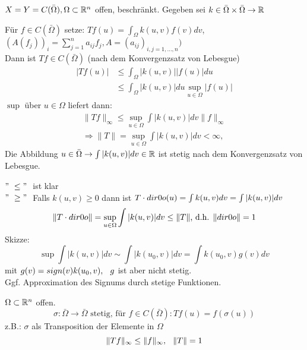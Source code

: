 \begin{beispiel}[Integraloperator] 
	$X = Y = C(\bar \Omega), \Omega \subset \mathbb{R}^{n}$ offen, beschränkt.
	Gegeben sei $k \in \bar \Omega \times \bar \Omega \rightarrow \mathbb{R} $
	
	Für $f \in C(\bar \Omega)$ setze: $Tf(u) = \int_{\Omega} k(u, v) f(v) dv$, \hspace{0.25cm}
	$\left( A( f_{j} ) \right)_{i} = \sum_{j = 1}^{n} a_{ij}f_{j}, A = (a_{ij})_{i,j = 1, \dotsc, n} )$ \\
	
	Dann ist $Tf \in C(\bar \Omega)$ (nach dem Konvergenzsatz von Lebesgue)
	\begin{align*}
		|T f(u)| & \leq \int_{\Omega} |k(u, v)| |f(u)| du \\
				 & \leq \int_{\Omega} |k(u, v)| du \sup_{u \in \Omega} | f(u) |
	\end{align*} 				 
	$\sup$ über $u \in \Omega$ liefert dann:
	\begin{align*}
		\| Tf \|_{\infty} \leq \sup_{u \in \Omega} \int |k(u,v)| dv \| f \|_{\infty} \\
		\Rightarrow \| T \| = \sup_{u \in \Omega} \int |k(u, v)| dv < \infty,
	\end{align*} 	
	Die Abbildung $u \in \bar \Omega \rightarrow \int |k(u, v)| dv \in \mathbb{R}$ ist stetig nach dem Konvergenzsatz von Lebesgue. \\
	\begin{beweis}
		$ "\ \leq "\ $ ist klar \\
		$ "\ \geq "\ $ Falls $ k(u, v) \geq 0$ dann ist $T \cdot \1 (u) = \int k(u, v) dv = \int |k(u, v)| dv$ \\
		\[ \| T \cdot \1 \| = \sup_{u \in \Omega} \int |k(u, v)| dv \leq \| T \| \text{, d.h. } \| \1 \| = 1 \]
		Skizze:
		\[ \sup \int | k(u, v) | dv \sim \int | k(u_{0}, v) | dv = \int k(u_{0}, v) g(v) dv \]
		mit $g(v) = sign(v) k(u_{0}, v), \hspace{0.25cm} g$ ist aber nicht stetig. \\
		Ggf. Approximation des Signums durch stetige Funktionen.
	\end{beweis}
\end{beispiel}


\begin{beispiel}[Kompositionsoperator] 
$\Omega \subset \mathbb{R}^{n}$ offen. 
\[ \sigma \colon \bar \Omega \rightarrow \bar \Omega \text{ stetig, für } f \in C(\bar \Omega): Tf(u) = f(\sigma(u)) \]
z.B.: $\sigma$ als Transposition der Elemente in $\Omega$
\[ \| Tf \|_{\infty} \leq \| f \|_{\infty}, \hspace{0.25cm} \| T \| = 1 \]
\end{beispiel}


